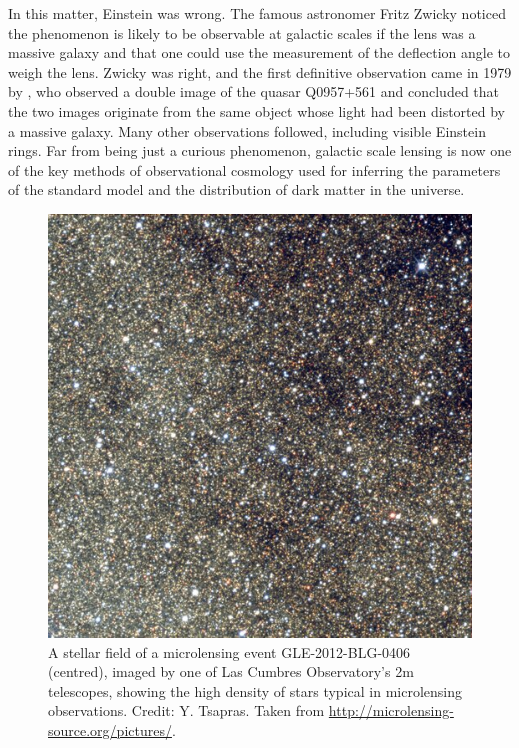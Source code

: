 \documentclass[12pt,dvipsnames]{report}
\begin{document}
In this matter, Einstein was wrong. The famous astronomer Fritz Zwicky noticed
the phenomenon is likely to be observable at galactic scales if the lens was a
massive galaxy \citep{1937PhRv...51..290Z,1937PhRv...51..679Z} and that one
could use the measurement of the deflection angle to weigh the lens. Zwicky was
right, and the first definitive observation came in 1979 by
\citet{1980ApJ...241..507Y}, who observed a double image of the quasar Q0957+561
and concluded that the two images originate from the same object whose light had been
distorted by a massive galaxy. Many other observations followed, including
visible Einstein rings. Far from being just a curious phenomenon, galactic
scale lensing is now one of the key methods of observational cosmology used
for inferring the parameters of the standard model and the distribution of dark
matter in the universe.

\begin{figure}
    \begin{centering}
        \includegraphics[width=0.5\linewidth]{../static/microlensing/crowded_field.jpg}
        \caption{
            A stellar field of a microlensing event GLE-2012-BLG-0406 (centred),
            imaged by one of Las Cumbres Observatory's 2m telescopes,
            showing the high density of stars typical in microlensing observations.
            Credit: Y. Tsapras. Taken from
            \url{http://microlensing-source.org/pictures/}.}
        \label{fig:crowded_field}
    \end{centering}
\end{figure}
\end{document}
